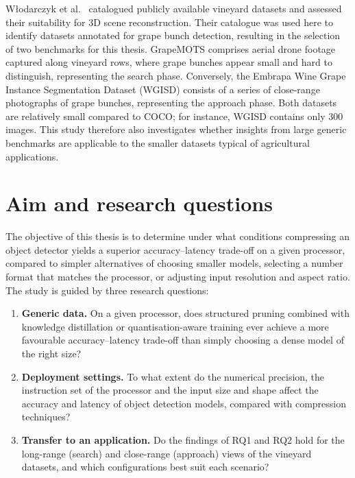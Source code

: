 \documentclass[a4paper,11pt,twoside]{report}
\theoremstyle{definition}
\begin{document}
W{\l}odarczyk et al.~\cite{Wlodarczyk2026GrapesReady} catalogued publicly available vineyard datasets and assessed their suitability for 3D scene reconstruction. Their catalogue was used here to identify datasets annotated for grape bunch detection, resulting in the selection of two benchmarks for this thesis. GrapeMOTS \cite{ArizaSentis2024GrapeMOTS} comprises aerial drone footage captured along vineyard rows, where grape bunches appear small and hard to distinguish, representing the search phase. Conversely, the Embrapa Wine Grape Instance Segmentation Dataset (WGISD) \cite{Santos2020WGISD} consists of a series of close-range photographs of grape bunches, representing the approach phase. Both datasets are relatively small compared to COCO; for instance, WGISD contains only 300 images. This study therefore also investigates whether insights from large generic benchmarks are applicable to the smaller datasets typical of agricultural applications.


\section{Aim and research questions}
\label{sec:intro_aim}

The objective of this thesis is to determine under what conditions compressing an object detector yields a superior accuracy--latency trade-off on a given processor, compared to simpler alternatives of choosing smaller models, selecting a number format that matches the processor, or adjusting input resolution and aspect ratio. The study is guided by three research questions:


\begin{enumerate}
    \item[\textbf{RQ1}] \textbf{Generic data.} On a given processor, does structured pruning combined with knowledge distillation or quantisation-aware training ever achieve a more favourable accuracy--latency trade-off than simply choosing a dense model of the right size?
    \item[\textbf{RQ2}] \textbf{Deployment settings.} To what extent do the numerical precision, the instruction set of the processor and the input size and shape affect the accuracy and latency of object detection models, compared with compression techniques?
    \item[\textbf{RQ3}] \textbf{Transfer to an application.} Do the findings of RQ1 and RQ2 hold for the long-range (search) and close-range (approach) views of the vineyard datasets, and which configurations best suit each scenario?
\end{enumerate}
\end{document}
